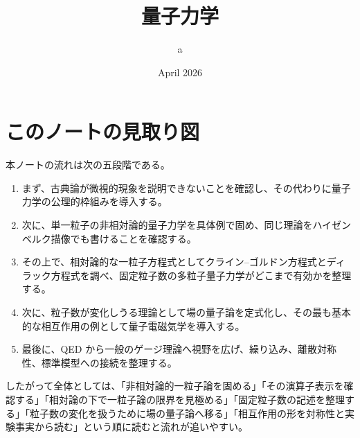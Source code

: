 \documentclass{article}
\title{量子力学}
\author{a}
\date{April 2026}
\begin{document}
\maketitle

\renewcommand{\contentsname}{目次}
\setcounter{tocdepth}{1}
\tableofcontents

\section*{このノートの見取り図}
本ノートの流れは次の五段階である。
\begin{enumerate}
\item まず、古典論が微視的現象を説明できないことを確認し、その代わりに量子力学の公理的枠組みを導入する。
\item 次に、単一粒子の非相対論的量子力学を具体例で固め、同じ理論をハイゼンベルク描像でも書けることを確認する。
\item その上で、相対論的な一粒子方程式としてクライン--ゴルドン方程式とディラック方程式を調べ、固定粒子数の多粒子量子力学がどこまで有効かを整理する。
\item 次に、粒子数が変化しうる理論として場の量子論を定式化し、その最も基本的な相互作用の例として量子電磁気学を導入する。
\item 最後に、QED から一般のゲージ理論へ視野を広げ、繰り込み、離散対称性、標準模型への接続を整理する。
\end{enumerate}
したがって全体としては、「非相対論的一粒子論を固める」「その演算子表示を確認する」「相対論の下で一粒子論の限界を見極める」「固定粒子数の記述を整理する」「粒子数の変化を扱うために場の量子論へ移る」「相互作用の形を対称性と実験事実から読む」という順に読むと流れが追いやすい。














\end{document}
